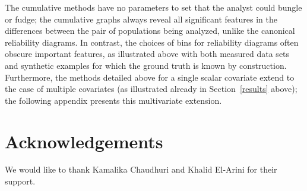 \documentclass[]{fairmeta}
\begin{document}
The cumulative methods have no parameters to set that the analyst could bungle
or fudge; the cumulative graphs always reveal all significant features
in the differences between the pair of populations being analyzed,
unlike the canonical reliability diagrams. In contrast, the choices of bins
for reliability diagrams often obscure important features,
as illustrated above with both measured data sets and synthetic examples
for which the ground truth is known by construction.
Furthermore, the methods detailed above for a single scalar covariate extend
to the case of multiple covariates (as illustrated already
in Section~\ref{results} above); the following appendix presents
this multivariate extension.



\section*{Acknowledgements}

We would like to thank Kamalika Chaudhuri and Khalid El-Arini
for their support.



\newlength{\vertsep}
\setlength{\vertsep}{.085in}
\newlength{\imsize}
\setlength{\imsize}{.365\textwidth}
\end{document}
